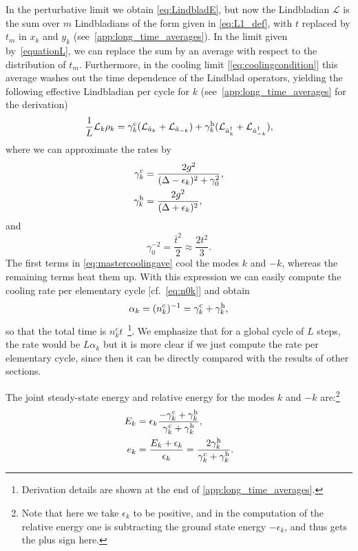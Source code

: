 \documentclass[aps,prx,twocolumn,superscriptaddress,nofootinbib,nolongbibliography,nobalancelastpage,10pt,floatfix]{revtex4-2}
\begin{document}
In the perturbative limit we obtain \cref{eq:LindbladE}, but now the Lindbladian $\mathcal{L}$ is the sum over $m$ Lindbladians of the form given in \cref{eq:L1_def}, with $t$ replaced by $t_m$ in $x_k$ and $y_k$ (see~\cref{app:long_time_averages}). In the limit given by~\cref{equationL}, we can replace the sum by an average with respect to the distribution of $t_m$. Furthermore, in the cooling limit [\cref{eq:coolingcondition}] this average washes out the time dependence of the Lindblad operators, yielding the following effective Lindbladian per cycle for $k$ (see~\cref{app:long_time_averages} for the derivation)
\begin{equation}
    \frac{1}{L}\mathcal{L}_k\rho_k= \gamma^{\rm c}_k (\mathcal{L}_{\hat{a}_k}  + \mathcal{L}_{\hat{a}_{-k}}) + \gamma^{\rm h}_k (\mathcal{L}_{\hat{a}_k^\dagger}  + \mathcal{L}_{\hat{a}_{-k}^\dagger}),
    \label{eq:mastercoolingave}
\end{equation}
where we can approximate the rates by
\begin{align}
    \gamma^{\rm c}_k &= \frac{2g^2}{(\Delta-\epsilon_k)^2+ \gamma_0^2}, \label{eq:gammac_def}\\
    \gamma^{\rm h}_k &= \frac{2g^2}{(\Delta+\epsilon_k)^2}, \label{eq:gammah_def}
\end{align}
and
\begin{equation}
    \gamma_0^{-2}=\frac{\bar t^2}{2}\approx \frac{2t^2}{3}.
    \label{eq:tau0a}
\end{equation}
The first terms in \cref{eq:mastercoolingave} cool the modes $k$ and $-k$, whereas the remaining terms heat them up. With this expression we can easily compute the cooling rate per elementary cycle [cf.~\cref{eq:n0k}] and obtain
\begin{equation}
    \alpha_k = (n^c_k)^{-1} = \gamma^{\rm c}_k + \gamma^{\rm h}_k,
    \label{eq:coolingrate}
\end{equation}
so that the total time is $n^c_k t$~\footnote{Derivation details are shown at the end of \cref{app:long_time_averages}.}.
We emphasize that for a global cycle of $L$ steps, the rate would be $L\alpha_k$ but it is more clear if we just compute the rate per elementary cycle, since then it can be directly compared with the results of other sections.

The joint steady-state energy and relative energy for the modes $k$ and $-k$ are:\footnote{Note that here we take $\epsilon_k$ to be positive, and in the computation of the relative energy one is subtracting the ground state energy $-\epsilon_k$, and thus gets the plus sign here.}
\begin{align}
    E_k &= \epsilon_k \frac{-\gamma^{\rm c}_k+\gamma^{\rm h}_k}{\gamma^{\rm c}_k+\gamma^{\rm h}_k}, \label{eq:avg_longtime_ss_Ek}\\
    e_k &= \frac{E_k+\epsilon_k}{\epsilon_k} = \frac{2\gamma^{\rm h}_k}{\gamma^{\rm c}_k+\gamma^{\rm h}_k}.
    \label{eq:avg_longtime_ss1}
\end{align}
\end{document}
